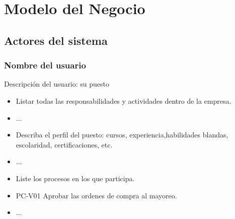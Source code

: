 
\chapter{Modelo del Negocio}	
\label{cap:reqSist}


\section{Actores del sistema}

	
	\begin{Usuario}{\hypertarget{nombreDelUsuario}{\subsection{Nombre del usuario}}}{
			Descripción del usuario: su puesto
		}
		\item[Responsabilidades:] \cdtEmpty
		\begin{itemize}
			\item Listar todas las responsabilidades y actividades dentro de la empresa.
			\item ...
		\end{itemize}
		
		\item[Perfil:] \cdtEmpty
		\begin{itemize}
			\item Describa el perfil del puesto: cursos, experiencia,habilidades blandas, escolaridad, certificaciones, etc.
			\item ...
		\end{itemize}
		\item[Procesos en los que participa:] \cdtEmpty
		\begin{itemize}
			\item Liste los procesos en los que participa.
			\item PC-V01 Aprobar las ordenes de compra al mayoreo.
			\item ...
		\end{itemize}
	\end{Usuario}
	
